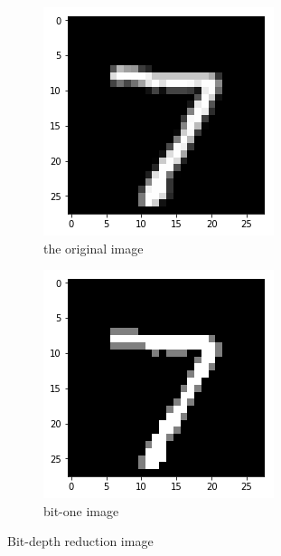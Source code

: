 \begin{figure}[h!]
	\centering
	\begin{subfigure}{.35\textwidth}
		\includegraphics[width=\textwidth]{original7.png}
		\caption{the original image}
		\label{fig: bit-depth reduction 1}
	\end{subfigure}
	\begin{subfigure}{.35\textwidth}
		\includegraphics[width=\textwidth]{bit1-7.png}
		\caption{bit-one image}
		\label{fig: bit-depth reduction 8}
	\end{subfigure}
	\caption{Bit-depth reduction image}
\end{figure}

